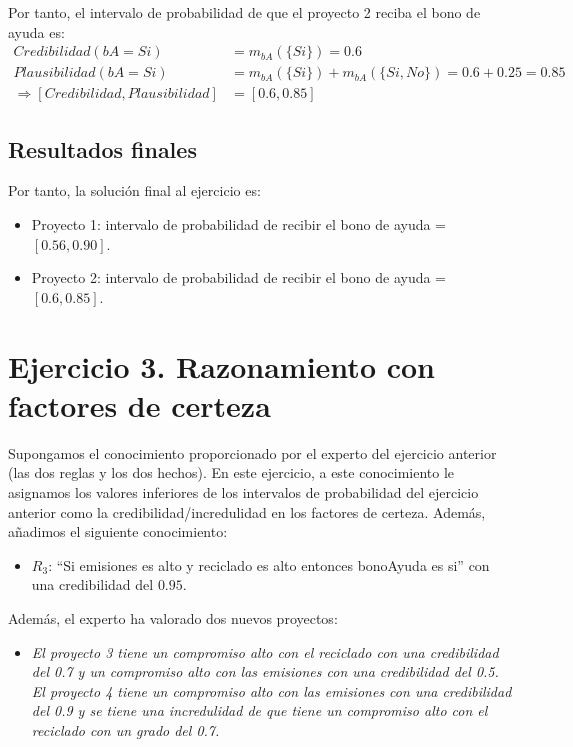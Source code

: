 \documentclass[11pt,a4paper]{article}
\begin{document}
Por tanto, el intervalo de probabilidad de que el proyecto 2 reciba el bono de ayuda es:
\begin{align*}
    Credibilidad(bA=Si) &= m_{bA}(\{Si\}) = 0.6 \\
    Plausibilidad(bA=Si) &= m_{bA}(\{Si\}) + m_{bA}(\{Si, No\}) = 0.6 + 0.25 = 0.85 \\
    \Rightarrow [Credibilidad, Plausibilidad] &= [0.6, 0.85]
\end{align*}

\subsection*{Resultados finales}

Por tanto, la solución final al ejercicio es:
\begin{itemize}
    \item Proyecto 1: intervalo de probabilidad de recibir el bono de ayuda = $[0.56, 0.90]$.
    \item Proyecto 2: intervalo de probabilidad de recibir el bono de ayuda = $[0.6, 0.85]$.
\end{itemize}

\section*{Ejercicio 3. Razonamiento con factores de certeza}

Supongamos el conocimiento proporcionado por el experto del ejercicio anterior (las dos reglas y los dos
hechos). En este ejercicio, a este conocimiento le asignamos los valores inferiores de los intervalos de
probabilidad del ejercicio anterior como la credibilidad/incredulidad en los factores de certeza. Además,
añadimos el siguiente conocimiento:
\begin{itemize}[leftmargin=2em, topsep=1ex]
    \item $R_3$: ``Si emisiones es alto y reciclado es alto entonces bonoAyuda es si'' con una credibilidad del $0.95$.
\end{itemize}

Además, el experto ha valorado dos nuevos proyectos: 

\begin{itemize}[leftmargin=2em, topsep=1ex]
    \item \textit{El proyecto 3 tiene un compromiso alto con el reciclado
    con una credibilidad del 0.7 y un compromiso alto con las emisiones con una credibilidad del 0.5. El proyecto 4
    tiene un compromiso alto con las emisiones con una credibilidad del 0.9 y se tiene una incredulidad de que tiene
    un compromiso alto con el reciclado con un grado del 0.7.}
\end{itemize}
\end{document}
